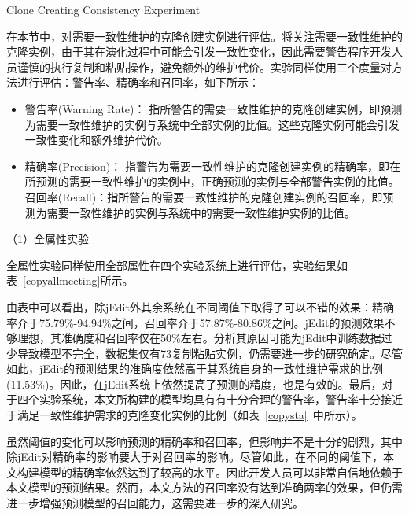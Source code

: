 {Clone Creating Consistency Experiment}

在本节中，对需要一致性维护的克隆创建实例进行评估。将关注需要一致性维护的克隆实例，由于其在演化过程中可能会引发一致性变化，因此需要警告程序开发人员谨慎的执行复制和粘贴操作，避免额外的维护代价。实验同样使用三个度量对方法进行评估：警告率、精确率和召回率，如下所示：

\begin{itemize}
\item	
警告率(Warning Rate)：
指所警告的需要一致性维护的克隆创建实例，即预测为需要一致性维护的实例与系统中全部实例的比值。这些克隆实例可能会引发一致性变化和额外维护代价。

\item	
精确率(Precision)：
指警告为需要一致性维护的克隆创建实例的精确率，即在所预测的需要一致性维护的实例中，正确预测的实例与全部警告实例的比值。
召回率(Recall)：指所警告的需要一致性维护的克隆创建实例的召回率，即预测为需要一致性维护的实例与系统中的需要一致性维护实例的比值。
\end{itemize}

（1）全属性实验

全属性实验同样使用全部属性在四个实验系统上进行评估，实验结果如表~\ref{copyallmeeting}所示。

由表中可以看出，除jEdit外其余系统在不同阈值下取得了可以不错的效果：精确率介于75.79\%-94.94\%之间，召回率介于57.87\%-80.86\%之间。jEdit的预测效果不够理想，其准确度和召回率仅在50\%左右。分析其原因可能为jEdit中训练数据过少导致模型不完全，数据集仅有73复制粘贴实例，仍需要进一步的研究确定。尽管如此，jEdit的预测结果的准确度依然高于其系统自身的一致性维护需求的比例(11.53\%)。因此，在jEdit系统上依然提高了预测的精度，也是有效的。最后，对于四个实验系统，本文所构建的模型均具有有十分合理的警告率，警告率十分接近于满足一致性维护需求的克隆变化实例的比例（如表~\ref {copysta}~中所示）。

虽然阈值的变化可以影响预测的精确率和召回率，但影响并不是十分的剧烈，其中除jEdit对精确率的影响要大于对召回率的影响。尽管如此，在不同的阈值下，本文构建模型的精确率依然达到了较高的水平。因此开发人员可以非常自信地依赖于本文模型的预测结果。然而，本文方法的召回率没有达到准确两率的效果，但仍需进一步增强预测模型的召回能力，这需要进一步的深入研究。

